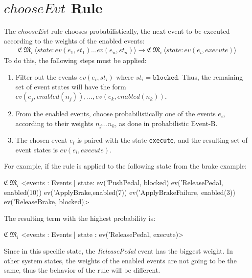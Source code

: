 \section{$chooseEvt$ Rule}
The $chooseEvt$ rule chooses probabilistically, the next event to be executed according to the weights of the enabled events:
\begin{align*}
    \mathfrak{C} \ \mathfrak{M}_i \ \langle state: ev(e_1,st_1) ... ev(e_n, st_n) \rangle \rightarrow 
    \mathfrak{C} \ \mathfrak{M}_i \ \langle state: ev(e_i, execute) \rangle
\end{align*}
To do this, the following steps must be applied:
\begin{enumerate}
    \item Filter out the events $ev(e_i, st_i)$ where $st_i = \texttt{blocked}$. Thus, the remaining set of event states will have the form $ev(e_j, enabled(n_j)),...,ev(e_k, enabled(n_k))$.
    \item From the enabled events, choose probabilistically one of the events $e_i$, according to their weights $n_j...n_k$, as done in probabilistic Event-B.
    \item The chosen event $e_i$ is paired with the state \texttt{execute}, and the resulting set of event states is $ev(e_i, execute)$.
\end{enumerate}
For example, if the rule is applied to the following state from the brake example:
\begin{maude}

$\mathfrak{C} \ \mathfrak{M}_i$ <events : Events | state: ev('PushPedal, blocked) 
                               ev('ReleasePedal, enabled(10)) 
                               ev('ApplyBrake,enabled(7)) 
                               ev('ApplyBrakeFailure, enabled(3))
                               ev('ReleaseBrake, blocked)>
\end{maude}
The resulting term with the highest probability is:
\begin{maude}

$\mathfrak{C} \ \mathfrak{M}_i$ <events : Events | state : ev('ReleasePedal, execute)>
\end{maude}
Since in this specific state, the \textit{ReleasePedal} event has the biggest weight. In other system states, the weights of the enabled events are not going to be the same, thus the behavior of the rule will be different.

